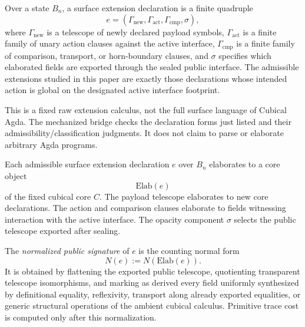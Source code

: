 \begin{definition}
Over a state \(B_n\), a surface extension declaration is a finite quadruple
\[
  e=(\Gamma_{\mathrm{new}},\Gamma_{\mathrm{act}},\Gamma_{\mathrm{cmp}},\sigma),
\]
where \(\Gamma_{\mathrm{new}}\) is a telescope of newly declared payload symbols,
\(\Gamma_{\mathrm{act}}\) is a finite family of unary action clauses against the active
interface, \(\Gamma_{\mathrm{cmp}}\) is a finite family of comparison, transport, or
horn-boundary clauses, and \(\sigma\) specifies which elaborated fields are exported through
the sealed public interface.  The admissible extensions studied in this paper are exactly
those declarations whose intended action is global on the designated active interface
footprint.
\end{definition}

This is a fixed raw extension calculus, not the full surface language of Cubical Agda.  The
mechanized bridge checks the declaration forms just listed and their
admissibility/classification judgments.  It does not claim to parse or elaborate arbitrary
Agda programs.

\begin{definition}
Each admissible surface extension declaration \(e\) over \(B_n\) elaborates to a core object
\[
  \mathrm{Elab}(e)
\]
of the fixed cubical core \(C\).  The payload telescope elaborates to new core declarations.
The action and comparison clauses elaborate to fields witnessing interaction with the active
interface.  The opacity component \(\sigma\) selects the public telescope exported after
sealing.

The \emph{normalized public signature} of \(e\) is the counting normal form
\[
  N(e) := N(\mathrm{Elab}(e)).
\]
It is obtained by flattening the exported public telescope, quotienting transparent telescope
isomorphisms, and marking as derived every field uniformly synthesized by definitional
equality, reflexivity, transport along already exported equalities, or generic structural
operations of the ambient cubical calculus.  Primitive trace cost is computed only after this
normalization.
\end{definition}


